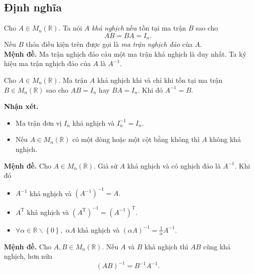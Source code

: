 \subsection{Định nghĩa}
Cho $A \in M_n \left( {\mathbb{R}} \right).$ Ta nói $A$ \textit{khả nghịch} nếu tồn tại ma trận $B$ sao cho
$$AB = BA = I_n.$$
Nếu $B$ thỏa điều kiện trên được gọi là \textit{ma trận nghịch đảo} của $A.$\\
\textbf{Mệnh đề.} Ma trận nghịch đảo cảu một ma trận khả nghịch là duy nhất. Ta ký hiệu ma trận nghịch đảo của $A$ là $A^{-1}.$
\begin{mybox}
\begin{theorem}
Cho $A \in M_n \left( {\mathbb{R}} \right).$ Ma trận $A$ khả nghịch khi và chỉ khi tồn tại ma trận $B \in M_n \left( {\mathbb{R}} \right)$ sao cho $AB = I_n$ hay $BA = I_n.$ Khi đó $A^{-1} = B.$
\end{theorem}
\end{mybox}
\begin{mybox}
\textbf{Nhận xét.} 
\begin{itemize}
\item Ma trận đơn vị $I_n$ khả nghịch và $I_n^{-1} = I_n.$
\item Nếu $A \in M_n \left( {\mathbb{R}} \right)$ có một dòng hoặc một cột bằng không thì $A$ không khả nghịch.
\end{itemize}
\end{mybox}
\textbf{Mệnh đề.} Cho $A \in M_n \left( {\mathbb{R}} \right).$ Giả sử $A$ khả nghịch và có nghịch đảo là $A^{-1}.$ Khi đó
\begin{itemize}
\item $A^{-1}$ khả nghịch và $\left( {A^{-1}} \right)^{-1} = A.$
\item $A^{\mathrm{T}}$ khả nghịch và $\left( {A^{\mathrm{T}}} \right)^{-1} = \left( {A^{-1}} \right)^{\mathrm{T}}.$
\item $\forall \alpha \in \mathbb{R} \backslash \left\{ 0 \right\},$ $\alpha A$ khả nghịch và ${\left( {\alpha A} \right)^{ - 1}} = \frac{1}{\alpha }{A^{ - 1}}.$
\end{itemize}
\textbf{Mệnh đề.} Cho $A, B \in M_n \left( {\mathbb{R}} \right).$ Nếu $A$ và $B$ khả nghịch thì $AB$ cũng khả nghịch, hơn nữa
$${\left( {AB} \right)^{ - 1}} = {B^{ - 1}}{A^{ - 1}}.$$
